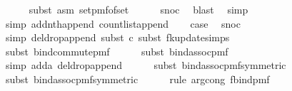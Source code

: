 \begin{isabellebody}
\ \ \ \ \isamarkupfalse%
\ {\isacharparenleft}{\kern0pt}subst\ {\isacharparenleft}{\kern0pt}asm{\isacharparenright}{\kern0pt}\ set{\isacharunderscore}{\kern0pt}pmf{\isacharunderscore}{\kern0pt}of{\isacharunderscore}{\kern0pt}set{\isacharparenright}{\kern0pt}\isanewline
\ \ \ \ \isamarkupfalse%
\ snoc\ \isamarkupfalse%
\ blast\ \isamarkupfalse%
\ simp\isanewline
\ \ \ \ \isamarkupfalse%
\ {\isacharparenleft}{\kern0pt}simp\ add{\isacharcolon}{\kern0pt}nth{\isacharunderscore}{\kern0pt}append\ count{\isacharunderscore}{\kern0pt}list{\isacharunderscore}{\kern0pt}append{\isacharparenright}{\kern0pt}\isanewline
\isanewline
\ \ \isamarkupfalse%
\ {\isacharquery}{\kern0pt}case\ \isamarkupfalse%
\ snoc\ \isanewline
\ \ \ \ \isamarkupfalse%
\ {\isacharparenleft}{\kern0pt}simp\ del{\isacharcolon}{\kern0pt}drop{\isacharunderscore}{\kern0pt}append{\isacharcomma}{\kern0pt}\ subst\ c{\isacharcomma}{\kern0pt}\ subst\ fk{\isacharunderscore}{\kern0pt}update{\isacharprime}{\kern0pt}{\isacharprime}{\kern0pt}{\isachardot}{\kern0pt}simps{\isacharparenright}{\kern0pt}\isanewline
\ \ \ \ \isamarkupfalse%
\ {\isacharparenleft}{\kern0pt}subst\ bind{\isacharunderscore}{\kern0pt}commute{\isacharunderscore}{\kern0pt}pmf{\isacharparenright}{\kern0pt}\isanewline
\ \ \ \ \isamarkupfalse%
\ {\isacharparenleft}{\kern0pt}subst\ bind{\isacharunderscore}{\kern0pt}assoc{\isacharunderscore}{\kern0pt}pmf{\isacharparenright}{\kern0pt}\isanewline
\ \ \ \ \isamarkupfalse%
\ {\isacharparenleft}{\kern0pt}simp\ add{\isacharcolon}{\kern0pt}a\ del{\isacharcolon}{\kern0pt}drop{\isacharunderscore}{\kern0pt}append{\isacharparenright}{\kern0pt}\isanewline
\ \ \ \ \isamarkupfalse%
\ {\isacharparenleft}{\kern0pt}subst\ bind{\isacharunderscore}{\kern0pt}assoc{\isacharunderscore}{\kern0pt}pmf{\isacharbrackleft}{\kern0pt}symmetric{\isacharbrackright}{\kern0pt}{\isacharparenright}{\kern0pt}\isanewline
\ \ \ \ \isamarkupfalse%
\ {\isacharparenleft}{\kern0pt}subst\ bind{\isacharunderscore}{\kern0pt}assoc{\isacharunderscore}{\kern0pt}pmf{\isacharbrackleft}{\kern0pt}symmetric{\isacharbrackright}{\kern0pt}{\isacharparenright}{\kern0pt}\isanewline
\ \ \ \ \isamarkupfalse%
\ {\isacharparenleft}{\kern0pt}rule\ arg{\isacharunderscore}{\kern0pt}cong{}{\isacharbrackleft}{\kern0pt}\ f{\isacharequal}{\kern0pt}{\isachardoublequoteopen}bind{\isacharunderscore}{\kern0pt}pmf{\isachardoublequoteclose}{\isacharbrackright}{\kern0pt}{\isacharparenright}{\kern0pt}\isanewline

\end{isabellebody}
